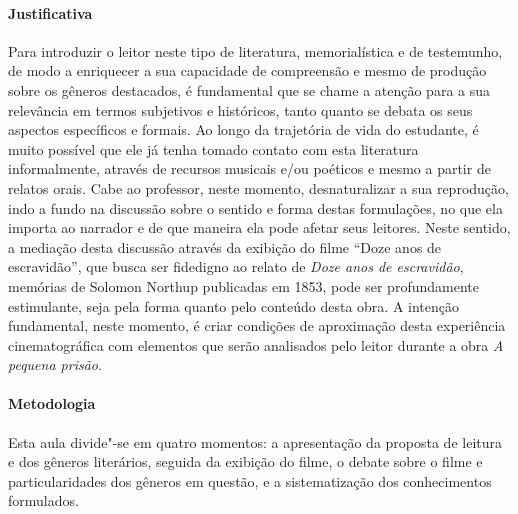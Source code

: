 \documentclass[11pt]{extarticle}
\begin{document}
\paragraph{Justificativa} Para introduzir o leitor neste tipo de
literatura, memorialística e de testemunho, de modo a enriquecer a sua
capacidade de compreensão e mesmo de produção sobre os gêneros
destacados, é fundamental que se chame a atenção para a sua relevância
em termos subjetivos e históricos, tanto quanto se debata os seus
aspectos específicos e formais. Ao longo da trajetória de vida do
estudante, é muito possível que ele já tenha tomado contato com esta
literatura informalmente, através de recursos musicais e/ou poéticos e
mesmo a partir de relatos orais. Cabe ao professor, neste momento,
desnaturalizar a sua reprodução, indo a fundo na discussão sobre o
sentido e forma destas formulações, no que ela importa ao narrador e de
que maneira ela pode afetar seus leitores. Neste sentido, a mediação
desta discussão através da exibição do filme ``Doze anos de escravidão'',
que busca ser fidedigno ao relato de \emph{Doze anos de escravidão},
memórias de Solomon Northup publicadas em 1853, pode ser profundamente
estimulante, seja pela forma quanto pelo conteúdo desta obra. A intenção
fundamental, neste momento, é criar condições de aproximação desta
experiência cinematográfica com elementos que serão analisados pelo
leitor durante a obra \emph{A pequena prisão}.

\paragraph{Metodologia} Esta aula divide"-se em quatro momentos: a
apresentação da proposta de leitura e dos gêneros literários, seguida da
exibição do filme, o debate sobre o filme e particularidades dos
gêneros em questão, e a sistematização dos conhecimentos formulados.
\end{document}
